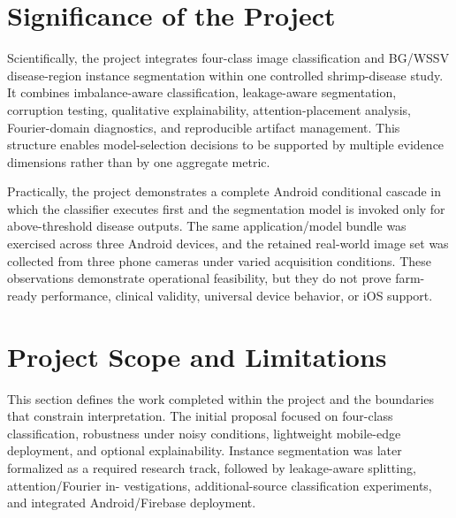 \documentclass[12pt,a4paper]{report}
\newenvironment{revisionblock}{\begin{snugshade}\noindent}{\end{snugshade}}
\begin{document}
\section{\texorpdfstring{\colorbox{RevisionYellow}{Significance of the Project}}{Significance of the Project}}
\begin{revisionblock}
Scientifically, the project integrates four-class image classification and BG/WSSV disease-region instance segmentation within one controlled shrimp-disease study. It combines imbalance-aware classification, leakage-aware segmentation, corruption testing, qualitative explainability, attention-placement analysis, Fourier-domain diagnostics, and reproducible artifact management. This structure enables model-selection decisions to be supported by multiple evidence dimensions rather than by one aggregate metric.
\end{revisionblock}
\begin{revisionblock}
Practically, the project demonstrates a complete Android conditional cascade in which the classifier executes first and the segmentation model is invoked only for above-threshold disease outputs. The same application/model bundle was exercised across three Android devices, and the retained real-world image set was collected from three phone cameras under varied acquisition conditions. These observations demonstrate operational feasibility, but they do not prove farm-ready performance, clinical validity, universal device behavior, or iOS support.
\end{revisionblock}
\section{\texorpdfstring{\colorbox{RevisionYellow}{Project Scope and Limitations}}{Project Scope and Limitations}}
\begin{revisionblock}
This section defines the work completed within the project and the boundaries that constrain interpretation. The initial proposal focused on four-class classification, robustness under noisy conditions, lightweight mobile-edge deployment, and optional explainability. Instance segmentation was later formalized as a required research track, followed by leakage-aware splitting, attention/Fourier in- vestigations, additional-source classification experiments, and integrated Android/Firebase deployment.
\end{revisionblock}
\end{document}
